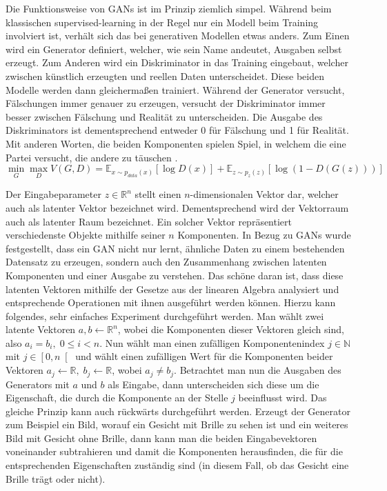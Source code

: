 Die Funktionsweise von GANs ist im Prinzip ziemlich simpel. Während beim
klassischen supervised-learning in der Regel nur ein Modell beim Training
involviert ist, verhält sich das bei generativen Modellen etwas anders. Zum
Einen wird ein Generator definiert, welcher, wie sein Name andeutet, Ausgaben
selbst erzeugt. Zum Anderen wird ein Diskriminator in das Training eingebaut,
welcher zwischen künstlich erzeugten und reellen Daten unterscheidet. Diese
beiden Modelle werden dann gleichermaßen trainiert. Während der Generator
versucht, Fälschungen immer genauer zu erzeugen, versucht der Diskriminator
immer besser zwischen Fälschung und Realität zu unterscheiden. Die
Ausgabe des Diskriminators ist dementsprechend entweder 0 für Fälschung und 1
für Realität. Mit anderen Worten, die beiden Komponenten spielen Spiel, in
welchem die eine Partei versucht, die andere zu täuschen
\cite{goodfellow2014generative}.
\[
\min_G \max_D V(G, D) = \mathbb{E}_{x \sim p_{data}(x)}\left[ \log D(x) \right] + \mathbb{E}_{z \sim p_z(z)}\left[ \log (1 - D(G(z))) \right]
\]

Der Eingabeparameter $z \in \mathbb{R}^n$ stellt einen $n$-dimensionalen Vektor dar, welcher auch als latenter Vektor bezeichnet wird. Dementsprechend wird der Vektorraum auch als latenter Raum bezeichnet. Ein solcher Vektor repräsentiert verschiedenste Objekte mithilfe seiner $n$ Komponenten. In Bezug zu GANs wurde festgestellt, dass ein GAN nicht nur lernt, ähnliche Daten zu einem bestehenden Datensatz zu erzeugen, sondern auch den Zusammenhang zwischen latenten Komponenten und einer Ausgabe zu verstehen. Das schöne daran ist, dass diese latenten Vektoren mithilfe der Gesetze aus der linearen Algebra analysiert und entsprechende Operationen mit ihnen ausgeführt werden können. Hierzu kann folgendes, sehr einfaches Experiment durchgeführt werden. Man wählt zwei latente Vektoren $a, b \leftarrow \mathbb{R}^n$, wobei die Komponenten dieser Vektoren gleich sind, also $a_i = b_i, \; 0 \leq i < n$. Nun wählt man einen zufälligen Komponentenindex $j \in \mathbb{N}$ mit $j \in \left[0, n\right[$ und wählt einen zufälligen Wert für die Komponenten beider Vektoren $a_j \leftarrow \mathbb{R},\; b_j \leftarrow \mathbb{R}$, wobei $a_j \neq b_j$. Betrachtet man nun die Ausgaben des Generators mit $a$ und $b$ als Eingabe, dann unterscheiden sich diese um die Eigenschaft, die durch die Komponente an der Stelle $j$ beeinflusst wird. Das gleiche Prinzip kann auch rückwärts durchgeführt werden. Erzeugt der Generator zum Beispiel ein Bild, worauf ein Gesicht mit Brille zu sehen ist und ein weiteres Bild mit Gesicht ohne Brille, dann kann man die beiden Eingabevektoren voneinander subtrahieren und damit die Komponenten herausfinden, die für die entsprechenden Eigenschaften zuständig sind (in diesem Fall, ob das Gesicht eine Brille trägt oder nicht).

